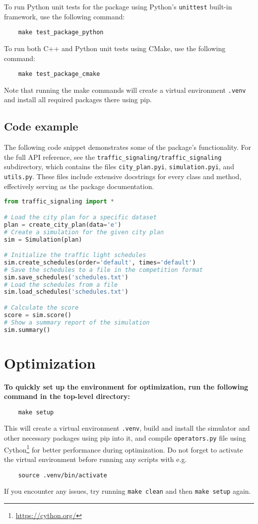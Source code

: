 \bigskip

To run Python unit tests for the package using Python's \verb|unittest| built-in framework, use the following command:
\begin{verbatim}
    make test_package_python
\end{verbatim}
To run both C++ and Python unit tests using CMake, use the following command:
\begin{verbatim}
    make test_package_cmake
\end{verbatim}
Note that running the make commands will create a virtual environment \verb|.venv| and install all required packages there using pip.

\subsection{Code example}

The following code snippet demonstrates some of the package's functionality. 
For the full API reference, see the \verb|traffic_signaling/traffic_signaling| subdirectory, which contains the files \verb|city_plan.pyi|, \verb|simulation.pyi|, and \verb|utils.py|. These files include extensive docstrings for every class and method, effectively serving as the package documentation.

\begin{lstlisting}[language=Python]
from traffic_signaling import *

# Load the city plan for a specific dataset
plan = create_city_plan(data='e')
# Create a simulation for the given city plan
sim = Simulation(plan)

# Initialize the traffic light schedules
sim.create_schedules(order='default', times='default')
# Save the schedules to a file in the competition format
sim.save_schedules('schedules.txt')
# Load the schedules from a file
sim.load_schedules('schedules.txt')

# Calculate the score
score = sim.score()
# Show a summary report of the simulation
sim.summary()
\end{lstlisting}

\bigskip

\section{Optimization} \label{sec:optimization}

\textbf{To quickly set up the environment for optimization, run the following command in the top-level directory:}
\begin{verbatim}
    make setup
\end{verbatim}
This will create a virtual environment \verb|.venv|, build and install the simulator and other necessary packages using pip into it, and compile \verb|operators.py| file using Cython\footnote{\url{https://cython.org/}} for better performance during optimization. Do not forget to activate the virtual environment before running any scripts with e.g.
\begin{verbatim}
    source .venv/bin/activate
\end{verbatim}
If you encounter any issues, try running \verb|make clean| and then \verb|make setup| again.

